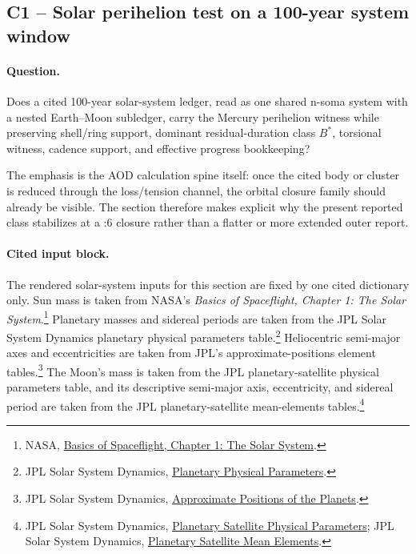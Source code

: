 \subsection{C1 -- Solar perihelion test on a 100-year system window}\label{app:c1}
\paragraph{Question.} Does a cited 100-year solar-system ledger, read as one shared n-soma system with a nested Earth--Moon subledger, carry the Mercury perihelion witness while preserving shell/ring support, dominant residual-duration class $B^*$, torsional witness, cadence support, and effective progress bookkeeping?

The emphasis is the AOD calculation spine itself: once the cited body or cluster is reduced through the loss/tension channel, the orbital closure family should already be visible. The section therefore makes explicit why the present reported class stabilizes at a :6 closure rather than a flatter or more extended outer report.

\paragraph{Cited input block.} The rendered solar-system inputs for this section are fixed by one cited dictionary only. Sun mass is taken from NASA's \emph{Basics of Spaceflight, Chapter 1: The Solar System}.\footnote{NASA, \href{https://science.nasa.gov/learn/basics-of-space-flight/chapter1-1/}{Basics of Spaceflight, Chapter 1: The Solar System}.} Planetary masses and sidereal periods are taken from the JPL Solar System Dynamics planetary physical parameters table.\footnote{JPL Solar System Dynamics, \href{https://ssd.jpl.nasa.gov/planets/phys_par.html}{Planetary Physical Parameters}.} Heliocentric semi-major axes and eccentricities are taken from JPL's approximate-positions element tables.\footnote{JPL Solar System Dynamics, \href{https://ssd.jpl.nasa.gov/planets/approx_pos.html}{Approximate Positions of the Planets}.} The Moon's mass is taken from the JPL planetary-satellite physical parameters table, and its descriptive semi-major axis, eccentricity, and sidereal period are taken from the JPL planetary-satellite mean-elements tables.\footnote{JPL Solar System Dynamics, \href{https://ssd.jpl.nasa.gov/sats/phys_par/}{Planetary Satellite Physical Parameters}; JPL Solar System Dynamics, \href{https://ssd.jpl.nasa.gov/sats/elem/}{Planetary Satellite Mean Elements}.}

